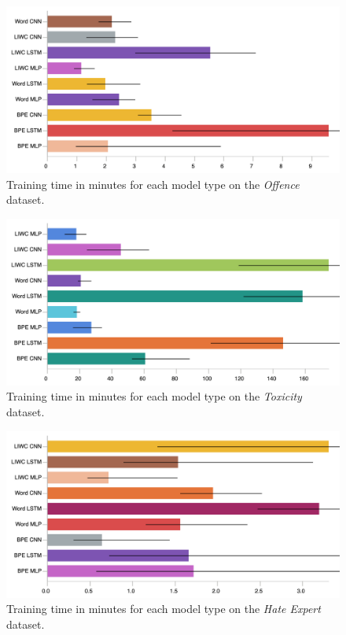 \begin{figure}[h]
    \centering
    \includegraphics[width=\textwidth]{davidson_train_time.pdf}
    \caption{Training time in minutes for each model type on the \textit{Offence} dataset.}
    \label{fig:davidson_train_time}
\end{figure}
\begin{figure}[h]
    \centering
    \includegraphics[width=\textwidth]{wulczyn_train_time.pdf}
    \caption{Training time in minutes for each model type on the \textit{Toxicity} dataset.}
    \label{fig:wulczyn_train_time}
\end{figure}
\begin{figure}[h]
    \centering
    \includegraphics[width=\textwidth]{waseem_train_time.pdf}
    \caption{Training time in minutes for each model type on the \textit{Hate Expert} dataset.}
    \label{fig:waseem_train_time}
\end{figure}
